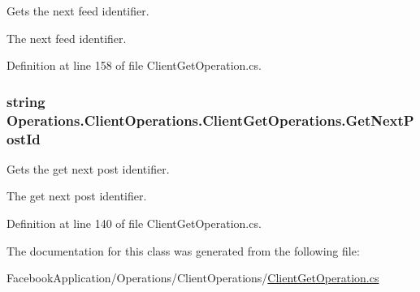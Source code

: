 Gets the next feed identifier. 

The next feed identifier.

Definition at line 158 of file Client\+Get\+Operation.\+cs.

\subsubsection[{\texorpdfstring{Get\+Next\+Post\+Id}{GetNextPostId}}]{\setlength{\rightskip}{0pt plus 5cm}string Operations.\+Client\+Operations.\+Client\+Get\+Operations.\+Get\+Next\+Post\+Id\hspace{0.3cm}{\ttfamily [get]}}\hypertarget{class_operations_1_1_client_operations_1_1_client_get_operations_a19be48989b7a11c85e9c4a1e6e38f26a}{}\label{class_operations_1_1_client_operations_1_1_client_get_operations_a19be48989b7a11c85e9c4a1e6e38f26a}


Gets the get next post identifier. 

The get next post identifier.

Definition at line 140 of file Client\+Get\+Operation.\+cs.



The documentation for this class was generated from the following file\+:\begin{DoxyCompactItemize}
\item 
Facebook\+Application/\+Operations/\+Client\+Operations/\hyperlink{_client_get_operation_8cs}{Client\+Get\+Operation.\+cs}\end{DoxyCompactItemize}
